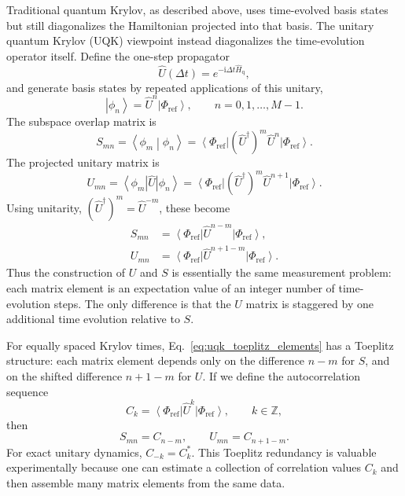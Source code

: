 \documentclass[11pt]{article}
\newcommand{\ii}{\mathrm{i}}
\newcommand{\ket}[1]{\left|#1\right\rangle}
\newcommand{\bra}[1]{\left\langle#1\right|}
\newcommand{\braket}[2]{\left\langle#1\middle|#2\right\rangle}
\begin{document}
Traditional quantum Krylov, as described above, uses time-evolved basis states but still diagonalizes the Hamiltonian projected into that basis.  The unitary quantum Krylov (UQK) viewpoint instead diagonalizes the time-evolution operator itself.  Define the one-step propagator
\begin{equation}
    \hat{U}(\Delta t)=e^{-\ii\Delta t\hat{H}_{\mathrm{q}}},
\end{equation}
and generate basis states by repeated applications of this unitary,
\begin{equation}
    \ket{\phi_n}=\hat{U}^n\ket{\Phi_{\mathrm{ref}}},
    \qquad n=0,1,\ldots,M-1.
\end{equation}
The subspace overlap matrix is
\begin{equation}
    S_{mn}=\braket{\phi_m}{\phi_n}
    = \bra{\Phi_{\mathrm{ref}}}(\hat{U}^{\dagger})^m\hat{U}^n\ket{\Phi_{\mathrm{ref}}}.
\end{equation}
The projected unitary matrix is
\begin{equation}
    U_{mn}=\bra{\phi_m}\hat{U}\ket{\phi_n}
    = \bra{\Phi_{\mathrm{ref}}}(\hat{U}^{\dagger})^m\hat{U}^{n+1}\ket{\Phi_{\mathrm{ref}}}.
\end{equation}
Using unitarity, $(\hat{U}^{\dagger})^m=\hat{U}^{-m}$, these become
\begin{align}
    S_{mn}
    &= \bra{\Phi_{\mathrm{ref}}}\hat{U}^{n-m}\ket{\Phi_{\mathrm{ref}}}, \\
    U_{mn}
    &= \bra{\Phi_{\mathrm{ref}}}\hat{U}^{n+1-m}\ket{\Phi_{\mathrm{ref}}}.
    \label{eq:uqk_toeplitz_elements}
\end{align}
Thus the construction of $U$ and $S$ is essentially the same measurement problem: each matrix element is an expectation value of an integer number of time-evolution steps.  The only difference is that the $U$ matrix is staggered by one additional time evolution relative to $S$.

For equally spaced Krylov times, Eq.~\eqref{eq:uqk_toeplitz_elements} has a Toeplitz structure: each matrix element depends only on the difference $n-m$ for $S$, and on the shifted difference $n+1-m$ for $U$.  If we define the autocorrelation sequence
\begin{equation}
    C_k=\bra{\Phi_{\mathrm{ref}}}\hat{U}^k\ket{\Phi_{\mathrm{ref}}},
    \qquad k\in\mathbb{Z},
\end{equation}
then
\begin{equation}
    S_{mn}=C_{n-m},
    \qquad
    U_{mn}=C_{n+1-m}.
\end{equation}
For exact unitary dynamics, $C_{-k}=C_k^*$.  This Toeplitz redundancy is valuable experimentally because one can estimate a collection of correlation values $C_k$ and then assemble many matrix elements from the same data.
\end{document}
